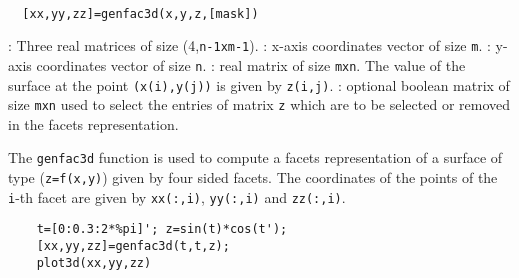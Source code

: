 
\begin{mandesc}
  \\ %
\end{mandesc}
\begin{calling_sequence}
\begin{verbatim}
  [xx,yy,zz]=genfac3d(x,y,z,[mask])
\end{verbatim}
\end{calling_sequence}

\begin{parameters}
  \begin{varlist}
    : Three real matrices of size (4,\verb!n-1xm-1!).
    : x-axis coordinates vector of size \verb!m!.
    : y-axis coordinates vector of size \verb!n!.
    : real matrix of size \verb!mxn!. The value of the surface at the point
    \verb!(x(i),y(j))! is given by \verb!z(i,j)!.
    : optional boolean matrix of size \verb!mxn! used to select the entries
    of matrix \verb!z! which are to be selected or removed in the facets representation.
  \end{varlist}
\end{parameters}

\begin{mandescription}
  The \verb!genfac3d! function is used to compute a facets representation of a surface of type
  (\verb!z=f(x,y)!)  given by four sided facets. The coordinates of the points of the \verb!i!-th facet are
  given by \verb!xx(:,i)!, \verb!yy(:,i)! and \verb!zz(:,i)!.
\end{mandescription}

\begin{examples}
  \begin{Verbatim}
    t=[0:0.3:2*%pi]'; z=sin(t)*cos(t');
    [xx,yy,zz]=genfac3d(t,t,z);
    plot3d(xx,yy,zz)
  \end{Verbatim}
\end{examples}
\begin{manseealso}
   
\end{manseealso}
